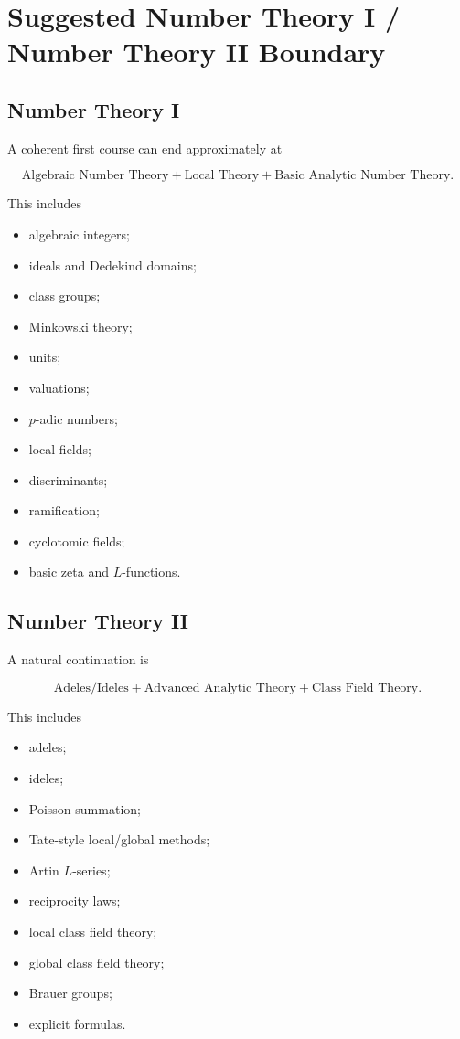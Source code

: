 \documentclass[11pt,a4paper]{article}
\begin{document}
\section{Suggested Number Theory I / Number Theory II Boundary}

\subsection{Number Theory I}

A coherent first course can end approximately at

\[
\boxed{
\text{Algebraic Number Theory}
+
\text{Local Theory}
+
\text{Basic Analytic Number Theory}.
}
\]

This includes

\begin{itemize}
    \item algebraic integers;
    \item ideals and Dedekind domains;
    \item class groups;
    \item Minkowski theory;
    \item units;
    \item valuations;
    \item \(p\)-adic numbers;
    \item local fields;
    \item discriminants;
    \item ramification;
    \item cyclotomic fields;
    \item basic zeta and \(L\)-functions.
\end{itemize}

\subsection{Number Theory II}

A natural continuation is

\[
\boxed{
\text{Adeles/Ideles}
+
\text{Advanced Analytic Theory}
+
\text{Class Field Theory}.
}
\]

This includes

\begin{itemize}
    \item adeles;
    \item ideles;
    \item Poisson summation;
    \item Tate-style local/global methods;
    \item Artin \(L\)-series;
    \item reciprocity laws;
    \item local class field theory;
    \item global class field theory;
    \item Brauer groups;
    \item explicit formulas.
\end{itemize}
\end{document}
